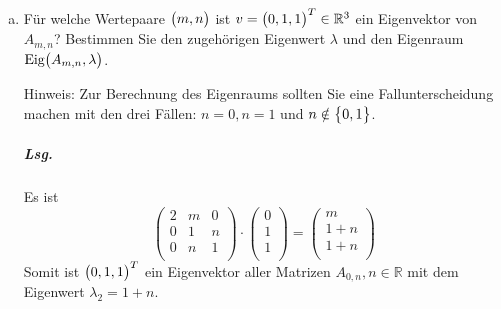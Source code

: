 \documentclass{scrreprt}
\begin{document}
\begin{enumerate}[(a)]
\newpage
\item Für welche Wertepaare $\qty\big(m, n)$ ist
  $v = \qty\big(0, 1, 1)^T \in \mathbb{R}^3$ ein Eigenvektor von $A_{m, n}$?
  Bestimmen Sie den zugehörigen Eigenwert $\lambda$ und den Eigenraum
  $\text{Eig}\qty\big(A_{m, n}, \lambda)$.

  \begin{small}
    Hinweis: Zur Berechnung des Eigenraums sollten Sie eine Fallunterscheidung
    machen mit den drei Fällen: $n = 0, n = 1$ und $n \notin \qty\big{0, 1}$.
  \end{small}

  \subparagraph{Lsg.} Es ist
  \[
    \begin{pmatrix}
      2 & m & 0 \\
      0 & 1 & n \\
      0 & n & 1 \\
    \end{pmatrix} \cdot \begin{pmatrix}
      0 \\
      1 \\
      1 \\
    \end{pmatrix} = \begin{pmatrix}
      m \\
      1 + n \\
      1 + n \\
    \end{pmatrix}
  \]
  Somit ist $\qty\big(0, 1, 1)^T$ ein Eigenvektor aller Matrizen
  $A_{0, n}, n \in \mathbb{R}$ mit dem Eigenwert $\lambda_2 = 1 + n$.


\end{enumerate}
\end{document}
